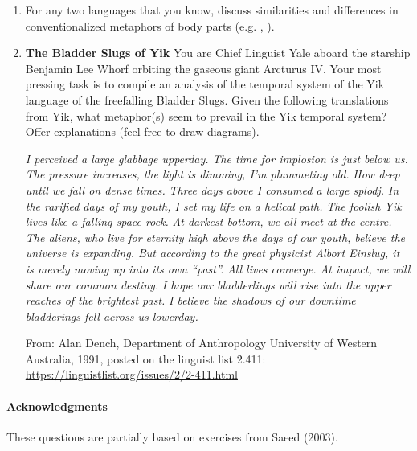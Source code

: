\documentclass[a4paper]{article}
\begin{document}
\begin{enumerate}
\item For any two languages that you know, discuss similarities and
  differences in conventionalized metaphors of body parts
  (e.g. , ).
\newpage
\item \textbf{The Bladder Slugs of Yik}
  You are Chief Linguist Yale aboard the starship Benjamin Lee Whorf
  orbiting the gaseous giant Arcturus IV. Your most pressing task is
  to compile an analysis of the temporal system of the Yik language of
  the freefalling Bladder Slugs. Given the following translations from
  Yik, what metaphor(s) seem to prevail in the Yik temporal system?
  Offer explanations (feel free to draw diagrams).
  \begin{exe}
    \ex \textit{I perceived a large glabbage upperday.}
    \ex \textit{The time for implosion is just below us. }
    \ex \textit{The pressure increases, the light is dimming, I'm plummeting old.}
    \ex \textit{How deep until we fall on dense times.}
    \ex \textit{Three days above I consumed a large splodj.}
    \ex \textit{In the rarified days of my youth, I set my life on a helical path.}
    \ex \textit{The foolish Yik lives like a falling space rock.}
    \ex \textit{At darkest bottom, we all meet at the centre.}
    \ex \textit{The aliens, who live for eternity high above the days of our youth, believe the universe is expanding. But according to the great physicist Albort Einslug, it is merely moving up into its own ``past''.}
    \ex \textit{All lives converge. At impact, we will share our common destiny.}
    \ex \textit{I hope our bladderlings will rise into the upper reaches of the brightest past.}
    \ex \textit{I believe the shadows of our downtime bladderings fell across us lowerday.}
  \end{exe}
From:  Alan Dench, Department of Anthropology University of Western
Australia, 1991, posted on the linguist list 2.411: \url{https://linguistlist.org/issues/2/2-411.html}
\end{enumerate}

\vfill
\paragraph{Acknowledgments} These questions are partially
based on exercises from Saeed (2003).
\end{document}
